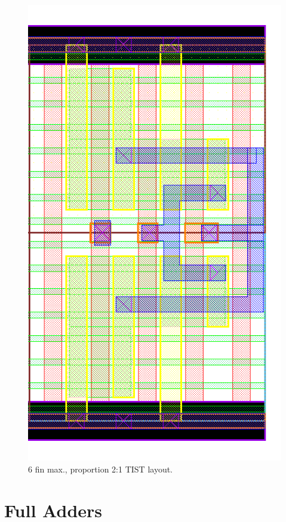 \documentclass[pgmicro,mestrado,english]{iiufrgs}
\begin{document}
\begin{figure}[]
\centering
\includegraphics[width=\textwidth,height=\textheight,keepaspectratio]{TIST6F3F.png}
\caption{6 fin max., proportion 2:1 TIST layout.}
\label{fig:TIST5F}
\end{figure}





\chapter{Full Adders}
\end{document}
